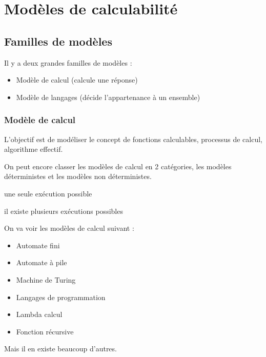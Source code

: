 
\chapter{Modèles de calculabilité}
\label{sec:mod_le_de_la_calculabilit_}

\section{Familles de modèles}
\label{sub:fammilles_de_mod_les}

Il y a deux grandes familles de modèles :
\begin{itemize}
	\item Modèle de calcul (calcule une réponse)
	\item Modèle de langages (décide l'appartenance à un ensemble)
\end{itemize}

\subsection{Modèle de calcul}
\label{ssub:mod_le_de_calcul}
L'objectif est de modéliser le concept de fonctions calculables, processus de
calcul, algorithme effectif.

On peut encore classer les modèles de calcul en 2 catégories, les
modèles déterministes et les modèles non déterministes.

\begin{mydef} une seule exécution possible
\end{mydef}

\begin{mydef} il existe plusieurs exécutions
	possibles
\end{mydef}

On va voir les modèles de calcul suivant :
\begin{itemize}
	\item Automate fini
	\item Automate à pile
	\item Machine de Turing
	\item Langages de programmation
	\item Lambda calcul
	\item Fonction récursive
\end{itemize}
Mais il en existe beaucoup d'autres.

